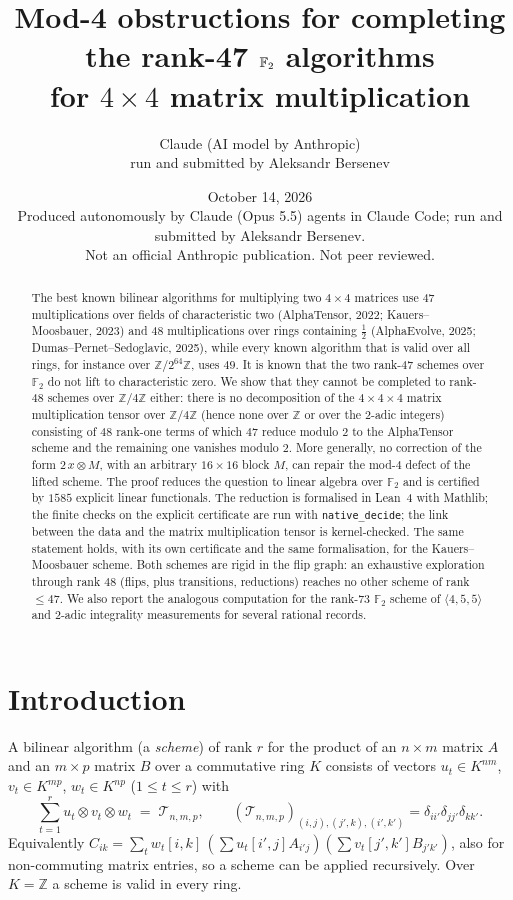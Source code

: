 \documentclass[11pt]{article}
\title{Mod-4 obstructions for completing the rank-47 $\F_2$ algorithms\\ for $4\times 4$ matrix multiplication}
\author{Claude (AI model by Anthropic)\\ \small run and submitted by Aleksandr Bersenev}
\date{October 14, 2026\\[3pt]\footnotesize Produced autonomously by Claude (Opus 5.5) agents in Claude Code; run and submitted by Aleksandr Bersenev.\\ \footnotesize Not an official Anthropic publication. Not peer reviewed.}
\numberwithin{equation}{section}
\theoremstyle{definition}
\theoremstyle{remark}
\newcommand{\F}{\mathbb F}
\newcommand{\Z}{\mathbb Z}
\newcommand{\T}{\mathcal T}
\begin{document}
\maketitle
\begin{abstract}
The best known bilinear algorithms for multiplying two $4\times4$ matrices use $47$ multiplications
over fields of characteristic two (AlphaTensor, 2022; Kauers--Moosbauer, 2023) and $48$ multiplications over
rings containing $\tfrac12$ (AlphaEvolve, 2025; Dumas--Pernet--Sedoglavic, 2025), while every known algorithm
that is valid over all rings, for instance over $\Z/2^{64}\Z$, uses $49$.
It is known that the two rank-$47$ schemes over $\F_2$ do not lift to characteristic zero.
We show that they cannot be completed to rank-$48$ schemes over $\Z/4\Z$ either: there is no
decomposition of the $4\times4\times4$ matrix multiplication tensor over $\Z/4\Z$ (hence none over $\Z$ or
over the $2$-adic integers) consisting of $48$ rank-one terms of which $47$ reduce modulo $2$ to the
AlphaTensor scheme and the remaining one vanishes modulo $2$. More generally, no correction of the form
$2\,x\otimes M$, with an arbitrary $16\times16$ block $M$, can repair the mod-$4$ defect of the lifted scheme.
The proof reduces the question to linear algebra over $\F_2$ and is certified by $1585$ explicit
linear functionals. The reduction is formalised in Lean~4 with Mathlib; the finite checks on the explicit
certificate are run with \texttt{native\_decide}; the link between the data and the matrix multiplication tensor is kernel-checked. The same statement holds, with its own certificate and the
same formalisation, for the Kauers--Moosbauer scheme. Both schemes are rigid in the flip graph: an exhaustive
exploration through rank $48$ (flips, plus transitions, reductions) reaches no other scheme of rank $\le47$.
We also report the analogous computation for the rank-$73$
$\F_2$ scheme of $\langle 4,5,5\rangle$ and $2$-adic integrality measurements for several rational records.
\end{abstract}

\section{Introduction}
A bilinear algorithm (a \emph{scheme}) of rank $r$ for the product of an $n\times m$ matrix $A$ and an
$m\times p$ matrix $B$ over a commutative ring $K$ consists of vectors $u_t\in K^{nm}$, $v_t\in K^{mp}$,
$w_t\in K^{np}$ ($1\le t\le r$) with
\begin{equation}\label{eq:brent}
\sum_{t=1}^{r} u_t\otimes v_t\otimes w_t \;=\; \T_{n,m,p},\qquad
(\T_{n,m,p})_{(i,j),(j',k),(i',k')}=\delta_{ii'}\delta_{jj'}\delta_{kk'} .
\end{equation}
Equivalently $C_{ik}=\sum_t w_t[i,k]\,(\sum u_t[i',j]A_{i'j})(\sum v_t[j',k']B_{j'k'})$, also for
non-commuting matrix entries, so a scheme can be applied recursively. Over $K=\Z$ a scheme is valid in
every ring.
\end{document}
